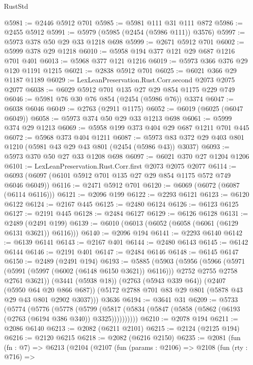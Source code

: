 \begin{lexlean}{RustStd}
\begin{coremodule}
@5981 := @2446 @5912 @701
@5985 := @5981 @111 @31 @111 @872
@5986 := @2455 @5912
@5991 := @5979 (@5985 (@2454 (@5986 @111)) @3576)
@5997 := @5973 @378 @50 @29 @33 @1218 @698
@5999 := @2671 @5912 @701
@6002 := @5999 @378 @29 @1218
@6010 := @5958 @194 @377 @121 @29 @687 @1216 @701 @401
@6013 := @5968 @377 @121 @1216
@6019 := @5973 @366 @376 @29 @120 @1191 @1215
@6021 := @2838 @5912 @701
@6025 := @6021 @366 @29 @1187 @1189
@6029 := LexLeanPreservation.Rust.Corr.second @2073 @2075 @2077
@6038 := @6029 @5912 @701 @135 @27 @29 @854 @1175 @229 @749
@6046 := @5981 @76 @30 @76 @854 (@2454 (@5986 @76)) @3374
@6047 := @6038 @6046
@6049 := @2763 (@2911 @1175)
@6052 := @6019 (@6025 (@6047 @6049))
@6058 := @5973 @374 @50 @29 @33 @1213 @698
@6061 := @5999 @374 @29 @1213
@6069 := @5958 @199 @373 @404 @29 @687 @1211 @701 @445
@6072 := @5968 @373 @404 @1211
@6087 := @5973 @83 @372 @29 @403 @801 @1210 (@5981 @43 @29 @43 @801 (@2454 (@5986 @43)) @3037)
@6093 := @5973 @370 @50 @27 @33 @1208 @698
@6097 := @6021 @370 @27 @1204 @1206
@6101 := LexLeanPreservation.Rust.Corr.first @2073 @2075 @2077
@6114 := @6093 (@6097 (@6101 @5912 @701 @135 @27 @29 @854 @1175 @572 @749 @6046 @6049))
@6116 := @2471 @5912 @701
@6120 := @6069 (@6072 (@6087 (@6114 @6116)))
@6121 := @2096 @199
@6122 := @2293 @6121
@6123 := @6120 @6122
@6124 := @2167 @445
@6125 := @2480 @6124
@6126 := @6123 @6125
@6127 := @2191 @445
@6128 := @2484 @6127
@6129 := @6126 @6128
@6131 := @2489 (@2491 @199)
@6139 := @6010 (@6013 (@6052 (@6058 (@6061 (@6129 @6131 @3621)) @6116)))
@6140 := @2096 @194
@6141 := @2293 @6140
@6142 := @6139 @6141
@6143 := @2167 @401
@6144 := @2480 @6143
@6145 := @6142 @6144
@6146 := @2191 @401
@6147 := @2484 @6146
@6148 := @6145 @6147
@6150 := @2489 (@2491 @194)
@6193 := @5885
    (@5903
      (@5956
        (@5966
          (@5971 (@5991 (@5997 (@6002 (@6148 @6150 @3621)) @6116)))
          @2752
          @2755
          @2758
          @2761
          @3621))
      (@3441 (@5938 @18))
      (@2763 (@5943 @339 @64))
      (@2407 (@5950 @64 @20 @866 @687))
      (@5172 @2788 @701 @83 @29 @801 (@5878 @43 @29 @43 @801 @2902 @3037)))
    @3636
@6194 := @3641 @31
@6209 := @5733
    (@5774
      (@5776
        (@5778
          (@5799 (@5817 (@5834 (@5847 (@5858 (@5862 (@6193 (@2763 (@6194 @386 @340)) @3325))))))))))
@6210 := @2078 @194
@6211 := @2086 @6140
@6213 := @2082 (@6211 @2101)
@6215 := @2124 (@2125 @194)
@6216 := @2120 @6215
@6218 := @2082 (@6216 @2150)
@6235 := @2081
    (fun (fn : @7) =>
    @6213
      (@2104
        (@2107
          (fun (params : @2106) =>
          @2108
            (fun (rty : @716) =>

\end{coremodule}
\end{lexlean}
